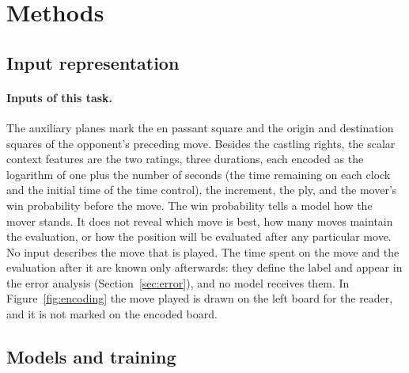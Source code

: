 \documentclass[11pt]{article}
\begin{document}
\begin{table}[htbp]\centering\small
{}
\caption{Dataset statistics by split.}
\label{tab:data}
\end{table}

\iflook
\begin{table}[htbp]\centering\small
{}
\caption{Summary statistics of selected variables over the whole dataset:
the mean, five quantiles, the minimum and the maximum. The time spent on the
move and the win probability lost by the move are known only after the move
and are not inputs.}
\label{tab:describe}
\end{table}
\fi

\section{Methods}
\label{sec:methods}

\subsection{Input representation}
\label{sec:input}



\paragraph{Inputs of this task.}
The auxiliary planes mark the en passant square and the origin and
destination squares of the opponent's preceding move. Besides the castling
rights, the scalar context features are the two ratings, three durations,
each encoded as the logarithm of one plus the number of seconds (the time
remaining on each clock and the initial time of the time control), the
increment, the ply, and the mover's win probability before the move. The win
probability tells a model how the
mover stands. It does not reveal which move is best, how many moves maintain
the evaluation, or how the position will be evaluated after any particular
move. No input describes the move that is played. The time spent on the move
and the evaluation after it are known only afterwards: they define the label
and appear in the error analysis (Section~\ref{sec:error}), and no model
receives them.\iflook{} In Figure~\ref{fig:encoding} the move played is drawn
on the left board for the reader, and it is not marked on the encoded
board.\fi

\subsection{Models and training}
\label{sec:models}
\end{document}

